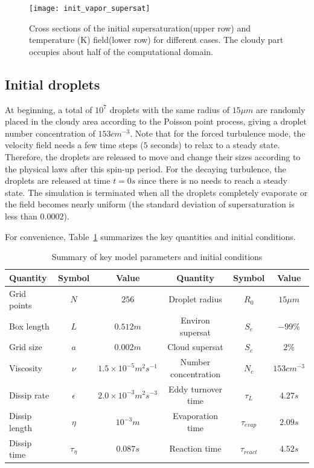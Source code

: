 \documentclass[draft,linenumbers]{agujournal}
\newcommand{\Table}[1]{Table~\ref{#1}}
\begin{document}
\begin{figure}\centering
\texttt{[image: init\_vapor\_supersat]}
\caption{Cross sections of the initial supersaturation(upper row) and temperature (K) field(lower row) for different cases. The cloudy part occupies about half of the computational domain.\label{fig:slice_case123}}
\end{figure}

\subsection{Initial droplets}

At beginning, a total of $10^{7}$ droplets with the same radius of $15\mu m$ are randomly placed in the cloudy area according to the Poisson point process, giving a droplet number concentration of $153{cm}^{-3}$. Note that for the forced turbulence mode, the velocity field needs a few time steps ($5$ seconds) to relax to a steady state. Therefore, the droplets are released to move and change their sizes according to the physical laws after this spin-up period. For the decaying turbulence, the droplets are released at time $t = 0s$ since there is no needs to reach a steady state. The simulation is terminated when {\color{green}all the} droplets completely evaporate or the field becomes nearly uniform (the standard deviation of supersaturation is less than $0.0002$). 

For convenience, \Table{tb:parameters} summarizes the key quantities and initial conditions.
\begin{table}
\centering
\caption{Summary of key model parameters and initial conditions}
\label{tb:parameters}
\begin{tabular}{l c c c c c}
\hline
Quantity & Symbol & Value & Quantity & Symbol & Value\\
\hline
Grid points & $N$ & $256$ & Droplet radius & $R_{0}$ & $15\mu m$\\
Box length & $L$ & $0.512m$ & Environ supersat & $S_{e}$ & $-99\%$\\
Grid size & $a$ & $0.002m$ & Cloud supersat & $S_{c}$ & $2\%$\\
Viscosity & $\nu$ & $1.5\times10^{-5}m^{2}s^{-1}$ & Number concentration& $N_{c}$ & $153cm^{-3}$\\
Dissip rate& $\epsilon$ & $2.0\times10^{-3}m^{2}s^{-3}$ & Eddy turnover time & $\tau_{L}$ & $4.27s$\\
Dissip length& $\eta$ & $10^{-3}m$ & Evaporation time & $\tau_{evap}$ & $2.09s$\\
Dissip time& $\tau_{\eta}$ & $0.087s$ & Reaction time & $\tau_{react}$ & $4.52s$\\
\hline
\end{tabular}
\end{table}
\end{document}
